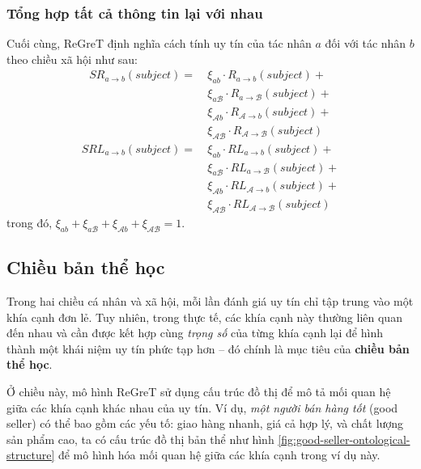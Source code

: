 \subsubsection{Tổng hợp tất cả thông tin lại với nhau}

Cuối cùng, ReGreT định nghĩa cách tính uy tín của tác nhân $a$ đối với tác nhân $b$ theo chiều xã hội như sau:
\begin{align*}
  SR_{a \rightarrow b}(subject) =\  & \xi_{ab} \cdot R_{a \rightarrow b}(subject) +                                       \\
                                    & \xi_{a\mathcal{B}} \cdot R_{a \rightarrow \mathcal{B}}(subject) +                   \\
                                    & \xi_{\mathcal{A}b} \cdot R_{\mathcal{A} \rightarrow b}(subject) +                   \\
                                    & \xi_{\mathcal{A}\mathcal{B}} \cdot R_{\mathcal{A} \rightarrow \mathcal{B}}(subject)
\end{align*}
\begin{align*}
  SRL_{a \rightarrow b}(subject) =\  & \xi_{ab} \cdot RL_{a \rightarrow b}(subject) +                                       \\
                                     & \xi_{a\mathcal{B}} \cdot RL_{a \rightarrow \mathcal{B}}(subject) +                   \\
                                     & \xi_{\mathcal{A}b} \cdot RL_{\mathcal{A} \rightarrow b}(subject) +                   \\
                                     & \xi_{\mathcal{A}\mathcal{B}} \cdot RL_{\mathcal{A} \rightarrow \mathcal{B}}(subject)
\end{align*}
trong đó, $\xi_{ab} + \xi_{a\mathcal{B}} + \xi_{\mathcal{A}b} + \xi_{\mathcal{A}\mathcal{B}} = 1$.

\subsection{Chiều bản thể học}

Trong hai chiều cá nhân và xã hội, mỗi lần đánh giá uy tín chỉ tập trung vào một khía cạnh đơn lẻ. Tuy nhiên, trong thực tế,
các khía cạnh này thường liên quan đến nhau và cần được kết hợp cùng \textit{trọng số} của từng khía cạnh lại để hình thành một khái niệm uy tín phức tạp hơn --
đó chính là mục tiêu của \textbf{chiều bản thể học}.

Ở chiều này, mô hình ReGreT sử dụng cấu trúc đồ thị để mô tả mối quan hệ giữa các khía cạnh khác nhau của uy tín.
Ví dụ, \textit{một người bán hàng tốt} (good seller) có thể bao gồm các yếu tố: giao hàng nhanh, giá cả hợp lý, và chất lượng sản phẩm cao,
ta có cấu trúc đồ thị bản thể như hình \ref{fig:good-seller-ontological-structure} để mô hình hóa mối quan hệ giữa các khía cạnh trong ví dụ này.

